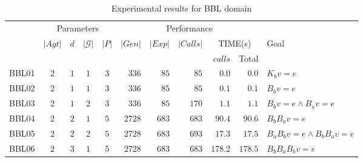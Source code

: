 \begin{table*}[ht]
    \addtolength{\tabcolsep}{-3pt}    
    \centering
    \small
    
        \begin{tabular}{lccccrrrrrl}%
        \toprule
        
        
        \multirow{3}{*}{}
        & \multicolumn{4}{c}{Parameters} & \multicolumn{5}{c}{Performance} &  \\
         \cmidrule(lr){2-5} \cmidrule(lr){6-10}
        & \multirow{2}{*}{$|Agt|$} & \multirow{2}{*}{$d$} & \multirow{2}{*}{$|\mathcal{G}|$} & \multirow{2}{*}{$|P|$} & \multirow{2}{*}{$|Gen|$} & \multirow{2}{*}{$|Exp|$} & \multirow{2}{*}{$|Calls|$} & \multicolumn{2}{c}{TIME(s)} &\multirow{2}{*}{Goal} \\
        & & & & & & & & {$calls$} & Total & \\
        \midrule
        BBL01 & $2$ & $1$ & $1$ & $3$ & $336$ & $85$ & $85$ & $0.0$  & $0.0$ & $K_b v=e$ \\
        BBL02 & $2$ & $1$ & $1$ & $3$ & $336$ & $85$ & $85$ & $0.1$ & $0.1$& $B_b v=e$ \\
        BBL03 & $2$ & $1$ & $2$ & $3$ & $336$ & $85$ & $170$ & $1.1$ & $1.1$ & $B_b v=e \land B_a v=e$ \\
        BBL04 & $2$ & $2$ & $1$ & $5$ & $2728$ & $683$ & $683$ & $90.4$ & $90.6$ & $B_b B_a v=e$ \\
        BBL05 & $2$ & $2$ & $2$ & $5$ & $2728$ & $683$ & $693$ & $17.3$ & $17.5$ & $B_a B_b v=e \land B_b B_a v=e$ \\
        BBL06 & $2$ & $3$ & $1$ & $5$ & $2728$ & $683$ & $683$ & $178.2$ & $178.5$& $B_b B_a B_b v=e$ \\
        \bottomrule
    \end{tabular}
    \caption{Experimental results for BBL domain}
    \label{tab:bbl}
\end{table*}


